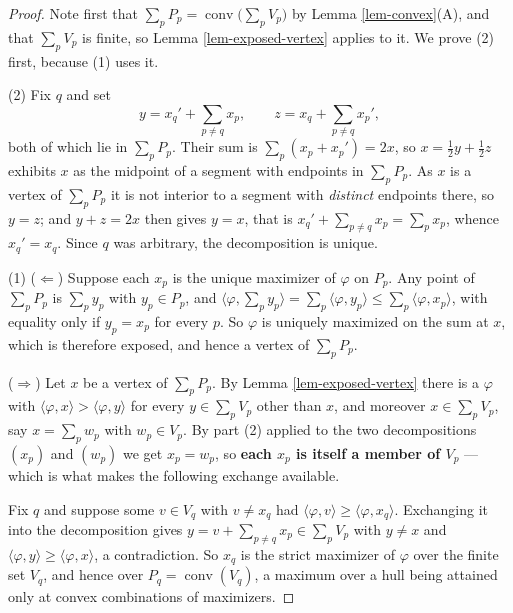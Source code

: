 \documentclass[11pt, a4paper, abstract=yes]{scrartcl}
\theoremstyle{definition}
\theoremstyle{remark}
\theoremstyle{plain}
\newcommand{\conv}{\operatorname{conv}}
\begin{document}
\begin{proof}
Note first that \(\sum_pP_p=\conv\bigl(\sum_pV_p\bigr)\) by Lemma \ref{lem-convex}(A), and that
\(\sum_pV_p\) is finite, so Lemma \ref{lem-exposed-vertex} applies to it. We prove (2) first, because
(1) uses it.

(2) Fix \(q\) and set
\begin{equation}\label{eq:vertexdecomp}
  y=x_q'+\sum_{p\ne q}x_p,\qquad z=x_q+\sum_{p\ne q}x_p' ,
\end{equation}
both of which lie in \(\sum_pP_p\). Their sum is \(\sum_p(x_p+x_p')=2x\), so
\(x=\tfrac12y+\tfrac12z\) exhibits \(x\) as the midpoint of a segment with endpoints in
\(\sum_pP_p\). As \(x\) is a vertex of \(\sum_pP_p\) it is not interior to a segment with
\emph{distinct} endpoints there, so \(y=z\); and \(y+z=2x\) then gives \(y=x\), that is
\(x_q'+\sum_{p\ne q}x_p=\sum_px_p\), whence \(x_q'=x_q\). Since \(q\) was arbitrary, the
decomposition is unique.

(1) (\(\Leftarrow\)) Suppose each \(x_p\) is the unique maximizer of \(\varphi\) on \(P_p\). Any point
of \(\sum_pP_p\) is \(\sum_py_p\) with \(y_p\in P_p\), and
\(\langle\varphi,\sum_py_p\rangle=\sum_p\langle\varphi,y_p\rangle\le\sum_p\langle\varphi,x_p\rangle\),
with equality only if \(y_p=x_p\) for every \(p\). So \(\varphi\) is uniquely maximized on the sum
at \(x\), which is therefore exposed, and hence a vertex of \(\sum_pP_p\).

(\(\Rightarrow\)) Let \(x\) be a vertex of \(\sum_pP_p\). By Lemma \ref{lem-exposed-vertex} there is a \(\varphi\) with
\(\langle\varphi,x\rangle>\langle\varphi,y\rangle\) for every \(y\in\sum_pV_p\) other than \(x\), and
moreover \(x\in\sum_pV_p\), say \(x=\sum_pw_p\) with \(w_p\in V_p\). By part (2) applied to the two
decompositions \((x_p)\) and \((w_p)\) we get \(x_p=w_p\), so \textbf{each \(x_p\) is itself a member of
\(V_p\)} --- which is what makes the following exchange available.

Fix \(q\) and suppose some \(v\in V_q\) with \(v\ne x_q\) had
\(\langle\varphi,v\rangle\ge\langle\varphi,x_q\rangle\). Exchanging it into the decomposition gives
\(y=v+\sum_{p\ne q}x_p\in\sum_pV_p\) with \(y\ne x\) and
\(\langle\varphi,y\rangle\ge\langle\varphi,x\rangle\), a contradiction. So \(x_q\) is the strict
maximizer of \(\varphi\) over the finite set \(V_q\), and hence over \(P_q=\conv(V_q)\), a maximum
over a hull being attained only at convex combinations of maximizers.
\end{proof}
\end{document}
